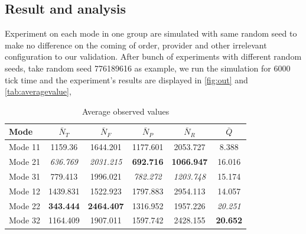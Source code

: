 \subsection{Result and analysis} %
\label{ssub:result_and_analysis}
Experiment on each mode in one group are simulated with same random seed to make no difference on the coming of order, provider and other irrelevant configuration to our validation.  After bunch of experiments with different random seeds, take random seed 776189616 as example, we run the simulation for 6000 tick time and the experiment's results are displayed in \autoref{fig:out} and \autoref{tab:averagevalue},
\begin{table}[htbp]
    \caption{Average observed values}
    \label{tab:averagevalue}
    \centering
    \scriptsize
    \begin{tabular}{lccccc}
    \toprule
    \textbf{Mode} & $\bar N_T$ & $\bar N_F$ & $\bar N_P$ & $\bar N_R $ & $\bar Q$\\
    \midrule
    Mode 11 & 1159.36 &  1644.201 &  1177.601 &  2053.727 &  8.388\\
    Mode 21 & \textit{636.769} &  \textit{2031.215} &  \textbf{692.716} &  \textbf{1066.947} &  16.016\\
    Mode 31 & 779.413 &  1996.021 &  \textit{782.272} &  \textit{1203.748} &  15.174\\
    Mode 12 & 1439.831 &  1522.923 &  1797.883 &  2954.113 &  14.057\\
    Mode 22 & \textbf{343.444} &  \textbf{2464.407} &  1316.952 &  1957.226 &  \textit{20.251}\\
    Mode 32 & 1164.409 &  1907.011 &  1597.742 &  2428.155 &  \textbf{20.652}\\

    \bottomrule
    \end{tabular}
\end{table}
